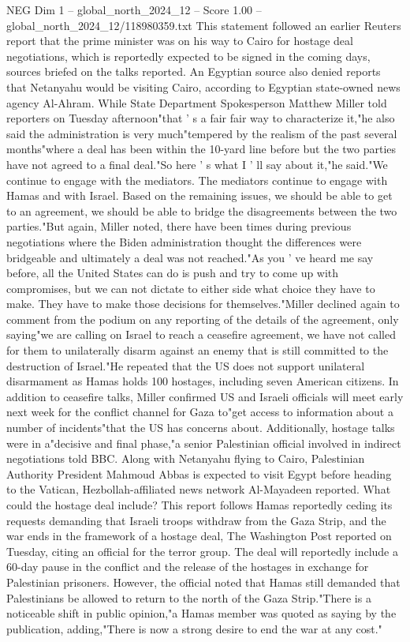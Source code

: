 \begin{textsample}{NEG Dim 1 – global\_north\_2024\_12 – Score 1.00 – global\_north\_2024\_12/118980359.txt}  \label{ex:f1_neg_226}
This statement followed an earlier Reuters report that the prime minister was on his way to Cairo for hostage deal negotiations, which is reportedly expected to be signed in the coming days, sources briefed on the talks reported.
An Egyptian source also denied reports that Netanyahu would be visiting Cairo, according to Egyptian state-owned news agency Al-Ahram.
While State Department Spokesperson Matthew Miller told reporters on Tuesday afternoon"that ' s a fair fair way to characterize it,"he also said the administration is very much"tempered by the realism of the past several months"where a deal has been within the 10-yard line before but the two parties have not agreed to a final deal."So here ' s what I ' ll say about it,"he said."We continue to engage with the mediators.
The mediators continue to engage with Hamas and with Israel.
Based on the remaining issues, we should be able to get to an agreement, we should be able to bridge the disagreements between the two parties."But again, Miller noted, there have been times during previous negotiations where the Biden administration thought the differences were bridgeable and ultimately a deal was not reached."As you ' ve heard me say before, all the United States can do is push and try to come up with compromises, but we can not dictate to either side what choice they have to make.
They have to make those decisions for themselves."Miller declined again to comment from the podium on any reporting of the details of the agreement, only saying"we are calling on Israel to reach a ceasefire agreement, we have not called for them to unilaterally disarm against an enemy that is still committed to the destruction of Israel."He repeated that the US does not support unilateral disarmament as Hamas holds 100 hostages, including seven American citizens.
In addition to ceasefire talks, Miller confirmed US and Israeli officials will meet early next week for the conflict channel for Gaza to"get access to information about a number of incidents"that the US has concerns about.
Additionally, hostage talks were in a"decisive and final phase,"a senior Palestinian official involved in indirect negotiations told BBC.
Along with Netanyahu flying to Cairo, Palestinian Authority President Mahmoud Abbas is expected to visit Egypt before heading to the Vatican, Hezbollah-affiliated news network Al-Mayadeen reported.
What could the hostage deal include?
This report follows Hamas reportedly ceding its requests demanding that Israeli troops withdraw from the Gaza Strip, and the war ends in the framework of a hostage deal, The Washington Post reported on Tuesday, citing an official for the terror group.
The deal will reportedly include a 60-day pause in the conflict and the release of the hostages in exchange for Palestinian prisoners.
However, the official noted that Hamas still demanded that Palestinians be allowed to return to the north of the Gaza Strip."There is a noticeable shift in public opinion,"a Hamas member was quoted as saying by the publication, adding,"There is now a strong desire to end the war at any cost."

\end{textsample}
